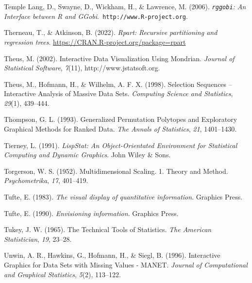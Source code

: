 \documentclass[
  letterpaper,
]{book}
\newlength{\cslhangindent}
\newlength{\cslentryspacingunit} %
\newenvironment{CSLReferences}[2] %
 {%
  \setlength{\parindent}{0pt}
  \ifodd #1
  \let\oldpar\par
  \def\par{\hangindent=\cslhangindent\oldpar}
  \fi
  \setlength{\parskip}{#2\cslentryspacingunit}
 }%
 {}
\begin{document}
\begin{CSLReferences}{1}{0}
\leavevmode{}%
Temple Lang, D., Swayne, D., Wickham, H., \& Lawrence, M. (2006).
\emph{{\texttt{rggobi}}: {A}n {I}nterface between {R} and
{GG}obi}.{\texttt{\ http://www.R-project.org}}.

\leavevmode{}%
Therneau, T., \& Atkinson, B. (2022). \emph{Rpart: Recursive
partitioning and regression trees}.
\url{https://CRAN.R-project.org/package=rpart}

\leavevmode{}%
Theus, M. (2002). Interactive {D}ata {V}isualization {U}sing {M}ondrian.
\emph{Journal of Statistical Software}, \emph{7}(11),
http://www.jstatsoft.org.

\leavevmode{}%
Theus, M., Hofmann, H., \& Wilhelm, A. F. X. (1998). Selection
{S}equences -- {I}nteractive {A}nalysis of {M}assive {D}ata {S}ets.
\emph{Computing Science and Statistics}, \emph{29}(1), 439--444.

\leavevmode{}%
Thompson, G. L. (1993). Generalized {P}ermutation {P}olytopes and
{E}xploratory {G}raphical {M}ethods for {R}anked {D}ata. \emph{The
Annals of Statistics}, \emph{21}, 1401--1430.

\leavevmode{}%
Tierney, L. (1991). \emph{{L}isp{S}tat: {A}n {O}bject-{O}rientated
{E}nvironment for {S}tatistical {C}omputing and {D}ynamic {G}raphics}.
John Wiley \& Sons.

\leavevmode{}%
Torgerson, W. S. (1952). Multidimensional {S}caling. 1. {T}heory and
{M}ethod. \emph{Psychometrika}, \emph{17}, 401--419.

\leavevmode{}%
Tufte, E. (1983). \emph{The visual display of quantitative information}.
Graphics Press.

\leavevmode{}%
Tufte, E. (1990). \emph{Envisioning information}. Graphics Press.

\leavevmode{}%
Tukey, J. W. (1965). The {T}echnical {T}ools of {S}tatistics. \emph{The
American Statistician}, \emph{19}, 23--28.

\leavevmode{}%
Unwin, A. R., Hawkins, G., Hofmann, H., \& Siegl, B. (1996).
{I}nteractive {G}raphics for {D}ata {S}ets with {M}issing {V}alues -
{MANET}. \emph{Journal of Computational and Graphical Statistics},
\emph{5}(2), 113--122.


\end{CSLReferences}
\end{document}
